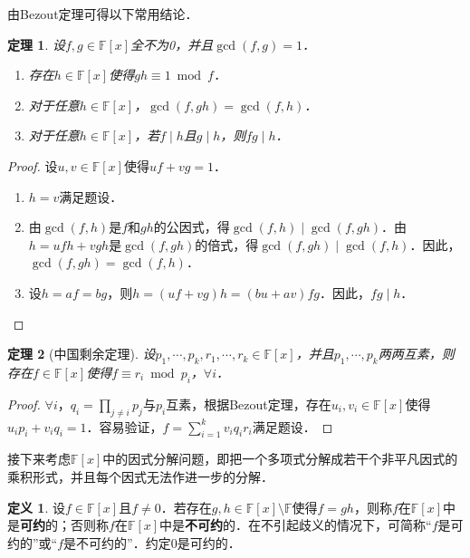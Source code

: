 \documentclass[a4paper,fontset=windows]{ctexbook}
\newtheorem{theorem}{定理}[chapter]
\theoremstyle{definition}
\newtheorem{definition}{定义}[chapter]
\begin{document}
由Bezout定理可得以下常用结论．

\begin{theorem}\label{thm11.8}
设$f,g\in\mathbb{F}[x]$全不为0，并且$\gcd(f,g)=1$．
\begin{enumerate}
\item 存在$h\in\mathbb{F}[x]$使得$gh\equiv 1\bmod f$．

\item 对于任意$h\in\mathbb{F}[x]$，$\gcd(f,gh)=\gcd(f,h)$．

\item 对于任意$h\in\mathbb{F}[x]$，若$f\mid h$且$g\mid h$，则$fg\mid h$．
\end{enumerate}
\end{theorem}

\begin{proof}
设$u,v\in\mathbb{F}[x]$使得$uf+vg=1$．
\begin{enumerate}
\item $h=v$满足题设．

\item 由$\gcd(f,h)$是$f$和$gh$的公因式，得$\gcd(f,h)\mid\gcd(f,gh)$．由$h=ufh+vgh$是$\gcd(f,gh)$的倍式，得$\gcd(f,gh)\mid\gcd(f,h)$．因此，$\gcd(f,gh)=\gcd(f,h)$．

\item 设$h=af=bg$，则$h=(uf+vg)h=(bu+av)fg$．因此，$fg\mid h$．\qedhere
\end{enumerate}
\end{proof}

\begin{theorem}[中国剩余定理]
设$p_1,\cdots,p_k,r_1,\cdots,r_k\in\mathbb{F}[x]$，并且$p_1,\cdots,p_k$两两互素，则存在$f\in\mathbb{F}[x]$使得$f\equiv r_i\bmod p_i$，$\forall i$．
\end{theorem}

\begin{proof}
$\forall i$，$q_i=\prod\limits_{j\ne i}p_j$与$p_i$互素，根据Bezout定理，存在$u_i,v_i\in\mathbb{F}[x]$使得$u_ip_i+v_iq_i=1$．容易验证，$f=\sum\limits_{i=1}^kv_iq_ir_i$满足题设．
\end{proof}

接下来考虑$\mathbb{F}[x]$中的因式分解问题，即把一个多项式分解成若干个非平凡因式的乘积形式，并且每个因式无法作进一步的分解．

\begin{definition}
设$f\in\mathbb{F}[x]$且$f\ne 0$．若存在$g,h\in\mathbb{F}[x]\setminus\mathbb{F}$使得$f=gh$，则称$f$在$\mathbb{F}[x]$中是{\bf 可约}的；否则称$f$在$\mathbb{F}[x]$中是{\bf 不可约}的．在不引起歧义的情况下，可简称“$f$是可约的”或“$f$是不可约的”．约定0是可约的．
\end{definition}
\end{document}
